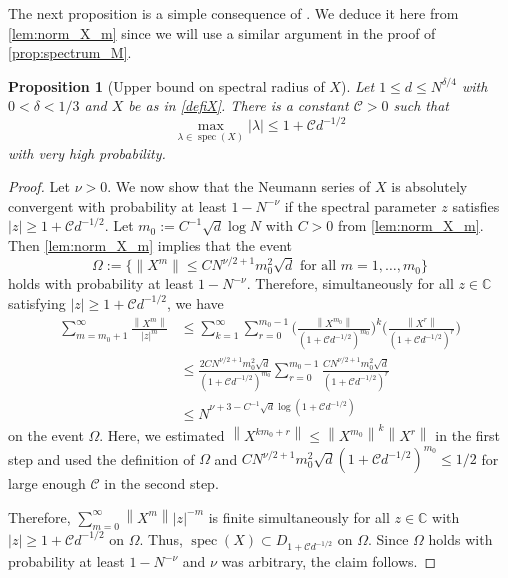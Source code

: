 \documentclass[10pt,a4paper]{amsart}
\DeclareMathOperator{\spec}{spec}
\newcommand{\abs}[1]{\left| #1 \right|}
\newcommand{\norm}[1]{\left\| #1 \right\|}
\newcommand{\C}{\mathbb{C}}
\newtheorem{prop}{Proposition}[section]
\numberwithin{equation}{section}
\begin{document}
 
The next proposition is a simple consequence of \cite[Theorem~2.11]{BBK_spec_radii}. 
We deduce it here from \cref{lem:norm_X_m} since we will use a similar argument in the proof of \cref{prop:spectrum_M}. 

\begin{prop}[Upper bound on spectral radius of $X$] \label{prop:upper_bdd_spec_radius_X} 
Let $1\le d \le N^{\delta/4}$ with $0<\delta <1/3$ and $X$ be as in \cref{defiX}. There is a constant $\mathcal C>0$ such that 
\[ \max_{\lambda \in \spec(X)} \abs{\lambda} \leq 1 + \mathcal C d^{-1/2} \] 
with very high probability. 
\end{prop}

\begin{proof} 
Let $\nu>0$. We now show that the Neumann series of $X$ is absolutely convergent  with probability at least $1-N^{-\nu}$ if the spectral parameter $z$ satisfies $\abs{z} \geq 1 + \mathcal C d^{-1/2}$. 
Let $m_0 := C^{-1} \sqrt{d} \log N$ with $C>0$ from \cref{lem:norm_X_m}. 
Then \cref{lem:norm_X_m} implies that the event 
\[ \Omega := \bigl\{ \|{X^m}\| \leq C N^{\nu/2+1}m_0^2 \sqrt{d} \text{ for all } m = 1, \ldots, m_0 \bigr\} \] 
holds with probability at least $1-N^{-\nu}$. Therefore, simultaneously for all $z \in \C$ satisfying $\abs{z} \geq 1 + \mathcal C d^{-1/2}$, we have  
\begin{align} 
\sum_{m=m_0+1}^\infty \frac{\norm{X^m}}{\abs{z}^m} & \leq \sum_{k=1}^\infty \sum_{r=0}^{m_0-1} \bigg( \frac{\norm{X^{m_0}}}{(1 + \mathcal C d^{-1/2})^{m_0}} \bigg)^k \bigg( \frac{\norm{X^r}}{( 1+ \mathcal C d^{-1/2})^{r}}\bigg) \nonumber \\ 
& \leq \frac{2 C N^{\nu/2 +1} m_0^2 \sqrt{d}}{(1 + \mathcal C d^{-1/2})^{m_0}} \sum_{r=0}^{m_0-1} \frac{CN^{\nu/2 + 1} m_0^2 \sqrt{d}}{(1 + \mathcal C d^{-1/2})^{r}} \nonumber \\ 
& \leq N^{\nu + 3 - C^{-1} \sqrt{d} \log (1 + \mathcal C d^{-1/2})} \label{eq:bound_Neumann_series} 
\end{align} 
on the event $\Omega$.
Here, we estimated $\norm{X^{km_0 + r}} \leq \norm{X^{m_0}}^k \norm{X^r}$ in the first step 
and used the definition of $\Omega$ and $C N^{\nu/2 + 1} m_0^2 \sqrt{d} (1 + \mathcal Cd^{-1/2})^{m_0} \leq 1/2$ for large enough $\mathcal C$ in the second step. 

Therefore, $\sum_{m=0}^\infty \norm{X^m} \abs{z}^{-m}$ is finite simultaneously for all $z \in\C$ with $\abs{z} \geq 1 + \mathcal C d^{-1/2}$ on $\Omega$. Thus, $\spec(X) \subset D_{1 + \mathcal C d^{-1/2}}$ on $\Omega$. 
Since $\Omega$ holds with probability at least $1-N^{-\nu}$ and $\nu$ was arbitrary, the claim follows. 
\end{proof} 
\end{document}
